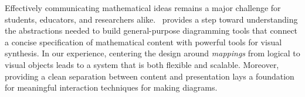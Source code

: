 





Effectively communicating mathematical ideas remains a major challenge for students, educators, and researchers alike. \Penrose\ provides a step toward understanding the abstractions needed to build general-purpose diagramming tools that connect a concise specification of mathematical content with powerful tools for visual synthesis.  In our experience, centering the design around \emph{mappings} from logical to visual objects leads to a system that is both flexible and scalable.  Moreover, providing a clean separation between content and presentation lays a foundation for meaningful interaction techniques for making diagrams.

